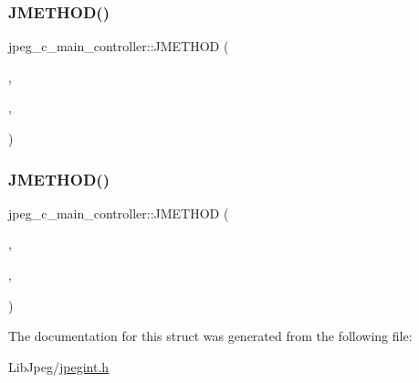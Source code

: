 \subsubsection{\texorpdfstring{JMETHOD()}{JMETHOD()}\hspace{0.1cm}{\footnotesize\ttfamily [1/2]}}
{\footnotesize\ttfamily jpeg\+\_\+c\+\_\+main\+\_\+controller\+::\+J\+M\+E\+T\+H\+OD (\begin{DoxyParamCaption}\item[{void}]{,  }\item[{\mbox{\hyperlink{jddctmgr_8c_a1964f006adb8fb80f57e455f6452aec1}{start\+\_\+pass}}}]{,  }\item[{(\mbox{\hyperlink{jpeglib_8h_add2a072c54e3a51550f4975f7ddb91e7}{j\+\_\+compress\+\_\+ptr}} cinfo, \mbox{\hyperlink{jpegint_8h_a1f0803342372ac62b6903c399399c874}{J\+\_\+\+B\+U\+F\+\_\+\+M\+O\+DE}} pass\+\_\+mode)}]{ }\end{DoxyParamCaption})}

\mbox{\label{structjpeg__c__main__controller_aefb0f62e18af1d6087803ac65bfd9bb9}} 
\subsubsection{\texorpdfstring{JMETHOD()}{JMETHOD()}\hspace{0.1cm}{\footnotesize\ttfamily [2/2]}}
{\footnotesize\ttfamily jpeg\+\_\+c\+\_\+main\+\_\+controller\+::\+J\+M\+E\+T\+H\+OD (\begin{DoxyParamCaption}\item[{void}]{,  }\item[{process\+\_\+data}]{,  }\item[{(\mbox{\hyperlink{jpeglib_8h_add2a072c54e3a51550f4975f7ddb91e7}{j\+\_\+compress\+\_\+ptr}} cinfo, \mbox{\hyperlink{jpeglib_8h_ac9d5d1b829ed51769db69a37271a7e91}{J\+S\+A\+M\+P\+A\+R\+R\+AY}} input\+\_\+buf, \mbox{\hyperlink{jmorecfg_8h_a04ed4674f6f1d0d50ec241531e38274f}{J\+D\+I\+M\+E\+N\+S\+I\+ON}} $\ast$in\+\_\+row\+\_\+ctr, \mbox{\hyperlink{jmorecfg_8h_a04ed4674f6f1d0d50ec241531e38274f}{J\+D\+I\+M\+E\+N\+S\+I\+ON}} in\+\_\+rows\+\_\+avail)}]{ }\end{DoxyParamCaption})}



The documentation for this struct was generated from the following file\+:\begin{DoxyCompactItemize}
\item 
Lib\+Jpeg/\mbox{\hyperlink{jpegint_8h}{jpegint.\+h}}\end{DoxyCompactItemize}
